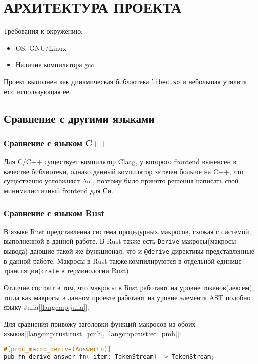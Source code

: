 \chapter{АРХИТЕКТУРА ПРОЕКТА}
\label{ch:ch1}


Требования к окружению:
\begin{itemize}
\item OS: GNU/Linux
\item Наличие компилятора gcc
\end{itemize}

\vspace{5pt}
Проект выполнен как динамическая библиотека \verb|libec.so| и небольшая утилита \verb|ecc| использующая ее.



\section{Сравнение с другими языками}
\subsection{Сравнение с языком C++}
Для C/C++ существует компилятор Clang, у которого frontend выненсен в качестве библиотеки, однако данный компилятор заточен больше на C++, что существенно услоожняет Ast, 
поэтому было принято решения написать свой минималистичный frontend для Си.

\subsection{Сравнение с языком Rust}
В языке Rust представленна система\cite{rust-proc-macro} процедурных макросов, схожая с системой, выполненной в данной работе.
В Rust также есть \verb|Derive| макросы(макросы вывода) дающие такой же функционал, что и \verb|@derive| директивы представленные в данной работе.
Макросы в Rust также компилируются в отдельной единице трансляции(\verb|crate| в терминологии Rust).

Отличие состоит в том, что макросы в Rust работают на уровне токенов(лексем), тогда как макросы в данном проекте работают на уровне элемента AST подобно языку Julia[\ref{langcmp:julia}].

Для сравнения привожу заголовки функций макросов из обоих языков[\ref{langcmp:rust:rust_pmh}, \ref{langcmp:rust:ec_pmh}]:


\begin{lstlisting}[language=C, caption={Заголовок процедурного макроса Rust}, label={langcmp:rust:rust_pmh}]
#[proc_macro_derive(AnswerFn)]
pub fn derive_answer_fn(_item: TokenStream) -> TokenStream;
\end{lstlisting}

